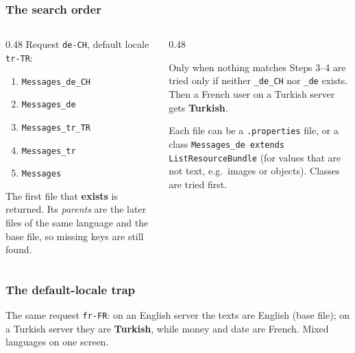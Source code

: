 \documentclass[aspectratio=169,10pt,compress]{beamer}
\begin{document}
\begin{frame}[t,fragile] \frametitle{The search order}
  \begin{columns}[T]
    \begin{column}{0.48\textwidth}
      \small Request \texttt{de-CH}, default locale \texttt{tr-TR}:
      \begin{enumerate}\small
        \item \texttt{Messages\_de\_CH}
        \item \texttt{Messages\_de}
        \item \texttt{Messages\_tr\_TR} 
        \item \texttt{Messages\_tr}
        \item \texttt{Messages}
      \end{enumerate}
      \small The first file that \textbf{exists} is returned. Its \emph{parents} are the later files of the
      same language and the base file, so missing keys are still found.
    \end{column}
    \begin{column}{0.48\textwidth}
      \begin{block}{Only when nothing matches}
        \small Steps 3--4 are tried only if neither \texttt{\_de\_CH} nor \texttt{\_de} exists.
        Then a French user on a Turkish server gets \textbf{Turkish}.
      \end{block}
      \begin{block}{Each file can be}
        \small a \texttt{.properties} file, or a class \texttt{Messages\_de extends ListResourceBundle}
        (for values that are not text, e.g.\ images or objects). Classes are tried first.
      \end{block}
    \end{column}
  \end{columns}
\end{frame}




\begin{frame}[t,fragile] \frametitle{The default-locale trap}

  \vspace{0.1em}
  \small
  The same request \texttt{fr-FR}: on an English server the texts are English (base file); on a Turkish server
  they are \textbf{Turkish}, while money and date are French. Mixed languages on one screen.
\end{frame}
\end{document}
